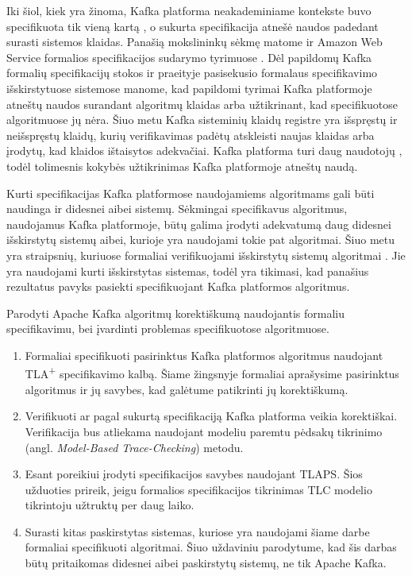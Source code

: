 \documentclass{VUMIFPSmagistrinis}
\begin{document}
		Iki šiol, kiek yra žinoma, Kafka platforma neakademiniame kontekste buvo specifikuota tik vieną kartą \cite{kfkTla}, o sukurta specifikacija atnešė naudos padedant surasti sistemos klaidas.
		Panašią mokslininkų sėkmę matome ir Amazon Web Service formalios specifikacijos sudarymo tyrimuose \cite{newcombe2014use}.
		Dėl papildomų Kafka formalių specifikacijų stokos ir praeityje pasisekusio formalaus specifikavimo išskirstytuose sistemose manome, kad papildomi tyrimai Kafka platformoje atneštų naudos surandant algoritmų klaidas arba užtikrinant, kad specifikuotose algoritmuose jų nėra.
		Šiuo metu Kafka sisteminių klaidų registre \cite{kfkissue} yra išspręstų ir neišspręstų  klaidų, kurių verifikavimas padėtų atskleisti naujas klaidas arba įrodytų, kad klaidos ištaisytos adekvačiai.
		Kafka platforma turi daug naudotojų \cite{kfk}, todėl tolimesnis kokybės užtikrinimas Kafka platformoje atneštų naudą.

		
		Kurti specifikacijas Kafka platformose naudojamiems algoritmams gali būti naudinga ir didesnei aibei sistemų. 
		Sėkmingai specifikavus algoritmus, naudojamus Kafka platformoje, būtų galima įrodyti adekvatumą daug didesnei išskirstytų sistemų aibei, kurioje yra naudojami tokie pat algoritmai. 
		Šiuo metu yra straipsnių, kuriuose formaliai verifikuojami išskirstytų sistemų algoritmai \cite{lamport2005generalized}. Jie yra naudojami kurti išskirstytas sistemas, todėl yra tikimasi, kad panašius rezultatus pavyks pasiekti specifikuojant Kafka platformos algoritmus.
	
		Parodyti Apache Kafka algoritmų korektiškumą naudojantis formaliu specifikavimu, bei įvardinti problemas specifikuotose algoritmuose.


	
		\begin{enumerate}
			\item{Formaliai specifikuoti pasirinktus Kafka platformos algoritmus naudojant TLA\textsuperscript{+} specifikavimo kalbą. Šiame žingsnyje formaliai aprašysime pasirinktus algoritmus ir jų savybes, kad galėtume patikrinti jų korektiškumą.}
			\item{Verifikuoti ar pagal sukurtą specifikaciją Kafka platforma veikia korektiškai. Verifikacija bus atliekama naudojant modeliu paremtu pėdsakų tikrinimo (angl. {\it Model-Based Trace-Checking}) metodu. }
			\item{Esant poreikiui įrodyti specifikacijos savybes naudojant TLAPS. Šios užduoties prireik, jeigu formalios specifikacijos tikrinimas TLC modelio tikrintoju užtruktų per daug laiko.}
			\item{Surasti kitas paskirstytas sistemas, kuriose yra naudojami šiame darbe formaliai specifikuoti algoritmai. Šiuo uždaviniu parodytume, kad šis darbas būtų pritaikomas didesnei aibei paskirstytų sistemų, ne tik Apache Kafka.}
		\end{enumerate}
	
\end{document}
